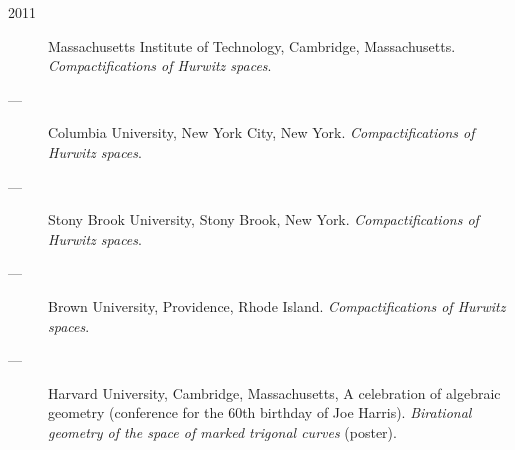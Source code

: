 \documentclass[11pt]{article}
\begin{document}
\begin{description}
\item[{2011}] Massachusetts Institute of Technology, Cambridge, Massachusetts. \emph{Compactifications of Hurwitz spaces}.
\item[{---}] Columbia University, New York City, New York. \emph{Compactifications of Hurwitz spaces}.
\item[{---}] Stony Brook University, Stony Brook, New York. \emph{Compactifications of Hurwitz spaces}.
\item[{---}] Brown University, Providence, Rhode Island. \emph{Compactifications of Hurwitz spaces}.
\item[{---}] Harvard University, Cambridge, Massachusetts, A celebration of algebraic geometry (conference for the 60th birthday of Joe Harris). \emph{Birational geometry of the space of marked trigonal curves} (poster).
\end{description}
\end{document}
